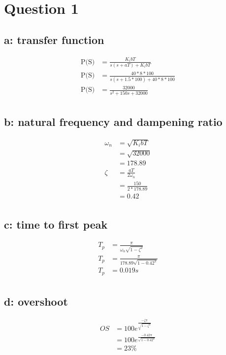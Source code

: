 \documentclass{article}
\begin{document}

\section{Question 1} %
\label{sec:question_1}
\subsection{a: transfer function} %
\label{sub:a_}
\begin{align*}
\text{P(S)} &= \frac{K_ibT}{s(s+aT) + K_ibT}\\
\text{P(S)} &= \frac{40 * 8 * 100}{s(s+1.5*100) + 40 * 8 * 100}\\
\text{P(S)} &= \frac{32000}{s^2 + 150s + 32000}\\
\end{align*}

\subsection{b: natural frequency and dampening ratio} %
\label{sub:b_}
\begin{align*}
\omega_n &= \sqrt{K_ibT}\\
    &= \sqrt{32000}\\
    &= 178.89\\
\zeta &= \frac{aT}{2\omega_n}\\
    &= \frac{150}{2*178.89}\\
    &= 0.42\\
\end{align*}

\subsection{c: time to first peak} %
\label{sub:c_time_to_first_peak}
\begin{align*}
T_p &= \frac{\pi}{\omega_n\sqrt{1-\zeta^2}}\\
T_p &= \frac{\pi}{178.89\sqrt{1-0.42^2}}\\
T_p &= 0.019s\\
\end{align*}

\subsection{d: overshoot} %
\label{sub:d_overshoot}
\begin{align*}
OS &= 100e^{\frac{-\zeta\pi}{\sqrt{1-\zeta^2}}}\\
    &= 100e^{\frac{-0.42\pi}{\sqrt{1-0.42^2}}}\\
    &= 23\%
\end{align*}
\end{document}
